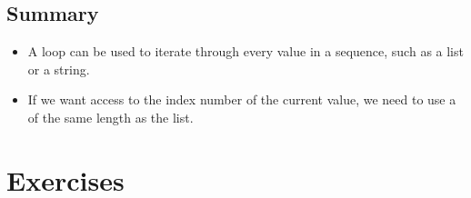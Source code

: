 \documentclass[11pt]{cselabheader}
\begin{document}
\subsection{Summary}
\begin{itemize}
  \item A  loop can be used to iterate through every value in a
    sequence, such as a list or a string.
  \item If we want access to the index number of the current value, we need to
    use a  of the same length as the list.
\end{itemize}

\pagebreak
\section{Exercises}
\label{sec:ex}
\end{document}

